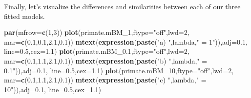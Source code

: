 \documentclass[fleqn,10pt,lineno]{wlpeerj}
\newenvironment{Shaded}{\begin{snugshade}}{\end{snugshade}}
\newcommand{\AttributeTok}[1]{\textcolor[rgb]{0.13,0.29,0.53}{#1}}
\newcommand{\DecValTok}[1]{\textcolor[rgb]{0.00,0.00,0.81}{#1}}
\newcommand{\FloatTok}[1]{\textcolor[rgb]{0.00,0.00,0.81}{#1}}
\newcommand{\FunctionTok}[1]{\textcolor[rgb]{0.13,0.29,0.53}{\textbf{#1}}}
\newcommand{\NormalTok}[1]{#1}
\newcommand{\StringTok}[1]{\textcolor[rgb]{0.31,0.60,0.02}{#1}}
\providecommand{\DIFdelend}{} %
\DeclareRobustCommand{\DIFdelend}{\DIFOaddend \let\includegraphics\DIFOincludegraphics} %
\begin{document}
\DIFdelend Finally, let's visualize the differences and similarities between each
of our three fitted models.

\begin{Shaded}
\begin{Highlighting}[]
\FunctionTok{par}\NormalTok{(}\AttributeTok{mfrow=}\FunctionTok{c}\NormalTok{(}\DecValTok{1}\NormalTok{,}\DecValTok{3}\NormalTok{))}
\FunctionTok{plot}\NormalTok{(primate.mBM\_1,}\AttributeTok{ftype=}\StringTok{"off"}\NormalTok{,}\AttributeTok{lwd=}\DecValTok{2}\NormalTok{,}
  \AttributeTok{mar=}\FunctionTok{c}\NormalTok{(}\FloatTok{0.1}\NormalTok{,}\FloatTok{0.1}\NormalTok{,}\FloatTok{2.1}\NormalTok{,}\FloatTok{0.1}\NormalTok{))}
\FunctionTok{mtext}\NormalTok{(}\FunctionTok{expression}\NormalTok{(}\FunctionTok{paste}\NormalTok{(}\StringTok{"a) "}\NormalTok{,lambda,}\StringTok{" = 1"}\NormalTok{)),}\AttributeTok{adj=}\FloatTok{0.1}\NormalTok{,}
  \AttributeTok{line=}\FloatTok{0.5}\NormalTok{,}\AttributeTok{cex=}\FloatTok{1.1}\NormalTok{)}
\FunctionTok{plot}\NormalTok{(primate.mBM\_0}\FloatTok{.1}\NormalTok{,}\AttributeTok{ftype=}\StringTok{"off"}\NormalTok{,}\AttributeTok{lwd=}\DecValTok{2}\NormalTok{,}
  \AttributeTok{mar=}\FunctionTok{c}\NormalTok{(}\FloatTok{0.1}\NormalTok{,}\FloatTok{1.1}\NormalTok{,}\FloatTok{2.1}\NormalTok{,}\FloatTok{0.1}\NormalTok{))}
\FunctionTok{mtext}\NormalTok{(}\FunctionTok{expression}\NormalTok{(}\FunctionTok{paste}\NormalTok{(}\StringTok{"b) "}\NormalTok{,lambda,}\StringTok{" = 0.1"}\NormalTok{)),}\AttributeTok{adj=}\FloatTok{0.1}\NormalTok{,}
  \AttributeTok{line=}\FloatTok{0.5}\NormalTok{,}\AttributeTok{cex=}\FloatTok{1.1}\NormalTok{)}
\FunctionTok{plot}\NormalTok{(primate.mBM\_10,}\AttributeTok{ftype=}\StringTok{"off"}\NormalTok{,}\AttributeTok{lwd=}\DecValTok{2}\NormalTok{,}
  \AttributeTok{mar=}\FunctionTok{c}\NormalTok{(}\FloatTok{0.1}\NormalTok{,}\FloatTok{1.1}\NormalTok{,}\FloatTok{2.1}\NormalTok{,}\FloatTok{0.1}\NormalTok{))}
\FunctionTok{mtext}\NormalTok{(}\FunctionTok{expression}\NormalTok{(}\FunctionTok{paste}\NormalTok{(}\StringTok{"c) "}\NormalTok{,lambda,}\StringTok{" = 10"}\NormalTok{)),}\AttributeTok{adj=}\FloatTok{0.1}\NormalTok{,}
  \AttributeTok{line=}\FloatTok{0.5}\NormalTok{,}\AttributeTok{cex=}\FloatTok{1.1}\NormalTok{)}
\end{Highlighting}
\end{Shaded}
\end{document}
